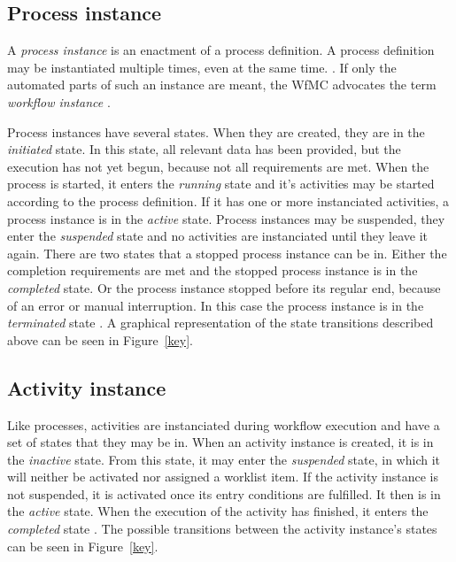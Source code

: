   \subsection{Process instance} %
  \label{sub:process_instance}
    A \emph{process instance} is an enactment of a process definition. A process definition may be instantiated multiple times, even at the same time. \cite{Casati1999Specification}. If only the automated parts of such an instance are meant, the \ac{WfMC} advocates the term \emph{workflow instance} \cite{Hollingsworth1995Wfmc}.

    Process instances have several states. When they are created, they are in the \emph{initiated} state. In this state, all relevant data has been provided, but the execution has not yet begun, \eg because not all requirements are met. When the process is started, it enters the \emph{running} state and it's activities may be started according to the process definition. If it has one or more instanciated activities, a process instance is in the \emph{active} state. Process instances may be suspended, \ie they enter the \emph{suspended} state and no activities are instanciated until they leave it again. There are two states that a stopped process instance can be in. Either the completion requirements are met and the stopped process instance is in the \emph{completed} state. Or the process instance stopped before its regular end, \ie because of an error or manual interruption. In this case the process instance is in the \emph{terminated} state \cite{Hollingsworth1995Wfmc}. A graphical representation of the state transitions described above can be seen in Figure~\ref{key}.


  \subsection{Activity instance} %
  \label{sub:activity_instance}
    Like processes, activities are instanciated during workflow execution and have a set of states that they may be in. When an activity instance is created, it is in the \emph{inactive} state. From this state, it may enter the \emph{suspended} state, in which it will neither be activated nor assigned a worklist item. If the activity instance is not suspended, it is activated once its entry conditions are fulfilled. It then is in the \emph{active} state. When the execution of the activity has finished, it enters the \emph{completed} state \cite{Hollingsworth1995Wfmc}. The possible transitions between the activity instance's states can be seen in Figure~\ref{key}.

